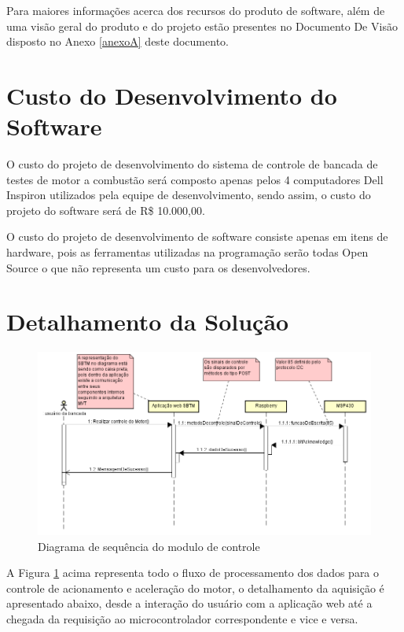 Para maiores informações acerca dos recursos do produto de software, além de uma visão geral do produto e do projeto estão presentes no Documento De Visão disposto no Anexo \ref{anexoA} deste documento.

\section{Custo do Desenvolvimento do Software}

O custo do projeto de desenvolvimento do sistema de controle de bancada de testes de motor a combustão será composto apenas pelos 4 computadores Dell Inspiron utilizados pela equipe de desenvolvimento, sendo assim, o custo do projeto do software será de R\$ 10.000,00.

O custo do projeto de desenvolvimento de software consiste apenas em itens de hardware, pois as ferramentas utilizadas na programação serão todas Open Source o que não representa um custo para os desenvolvedores.

\section{Detalhamento da Solução}

\begin{figure}[h!]
	\centering
	\includegraphics[keepaspectratio=true,scale= 0.7]{figuras/DiagramaDeSequenciaControle.PNG}
	\caption{Diagrama de sequência do modulo de controle}
	\label{diagramaControle}
\end{figure}

A Figura \ref{diagramaControle} acima representa todo o fluxo de processamento dos dados para o controle de acionamento e aceleração do motor, o detalhamento da aquisição é apresentado abaixo, desde a interação do usuário com a aplicação web até a chegada da requisição ao microcontrolador correspondente e vice e versa.

